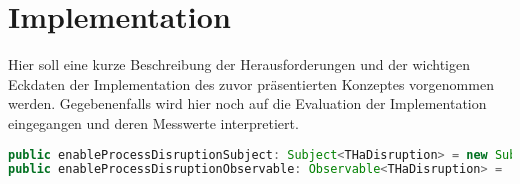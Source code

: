 \section{Implementation}\label{chap:implementation}

Hier soll eine kurze Beschreibung der Herausforderungen und der wichtigen Eckdaten der Implementation des zuvor präsentierten Konzeptes vorgenommen werden. Gegebenenfalls wird hier noch auf die Evaluation der Implementation eingegangen und deren Messwerte interpretiert.
\begin{lstlisting}[language=java, numbers=none, caption=Exemplarisches Beobachter-Muster]
public enableProcessDisruptionSubject: Subject<THaDisruption> = new Subject();  
public enableProcessDisruptionObservable: Observable<THaDisruption> = 		  this.enableProcessDisruptionSubject.asObservable(); 
\end{lstlisting}
